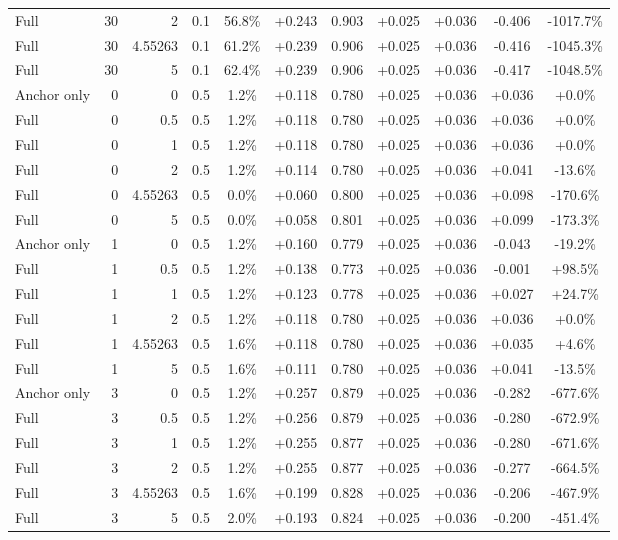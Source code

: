 \begin{table}[htbp]
\begin{tabular}{lrrrccccccc}
Full & 30 & 2 & 0.1 & 56.8\% & +0.243 & 0.903 & +0.025 & +0.036 & -0.406 & -1017.7\% \\
Full & 30 & 4.55263 & 0.1 & 61.2\% & +0.239 & 0.906 & +0.025 & +0.036 & -0.416 & -1045.3\% \\
Full & 30 & 5 & 0.1 & 62.4\% & +0.239 & 0.906 & +0.025 & +0.036 & -0.417 & -1048.5\% \\
Anchor only & 0 & 0 & 0.5 & 1.2\% & +0.118 & 0.780 & +0.025 & +0.036 & +0.036 & +0.0\% \\
Full & 0 & 0.5 & 0.5 & 1.2\% & +0.118 & 0.780 & +0.025 & +0.036 & +0.036 & +0.0\% \\
Full & 0 & 1 & 0.5 & 1.2\% & +0.118 & 0.780 & +0.025 & +0.036 & +0.036 & +0.0\% \\
Full & 0 & 2 & 0.5 & 1.2\% & +0.114 & 0.780 & +0.025 & +0.036 & +0.041 & -13.6\% \\
Full & 0 & 4.55263 & 0.5 & 0.0\% & +0.060 & 0.800 & +0.025 & +0.036 & +0.098 & -170.6\% \\
Full & 0 & 5 & 0.5 & 0.0\% & +0.058 & 0.801 & +0.025 & +0.036 & +0.099 & -173.3\% \\
Anchor only & 1 & 0 & 0.5 & 1.2\% & +0.160 & 0.779 & +0.025 & +0.036 & -0.043 & -19.2\% \\
Full & 1 & 0.5 & 0.5 & 1.2\% & +0.138 & 0.773 & +0.025 & +0.036 & -0.001 & +98.5\% \\
Full & 1 & 1 & 0.5 & 1.2\% & +0.123 & 0.778 & +0.025 & +0.036 & +0.027 & +24.7\% \\
Full & 1 & 2 & 0.5 & 1.2\% & +0.118 & 0.780 & +0.025 & +0.036 & +0.036 & +0.0\% \\
Full & 1 & 4.55263 & 0.5 & 1.6\% & +0.118 & 0.780 & +0.025 & +0.036 & +0.035 & +4.6\% \\
Full & 1 & 5 & 0.5 & 1.6\% & +0.111 & 0.780 & +0.025 & +0.036 & +0.041 & -13.5\% \\
Anchor only & 3 & 0 & 0.5 & 1.2\% & +0.257 & 0.879 & +0.025 & +0.036 & -0.282 & -677.6\% \\
Full & 3 & 0.5 & 0.5 & 1.2\% & +0.256 & 0.879 & +0.025 & +0.036 & -0.280 & -672.9\% \\
Full & 3 & 1 & 0.5 & 1.2\% & +0.255 & 0.877 & +0.025 & +0.036 & -0.280 & -671.6\% \\
Full & 3 & 2 & 0.5 & 1.2\% & +0.255 & 0.877 & +0.025 & +0.036 & -0.277 & -664.5\% \\
Full & 3 & 4.55263 & 0.5 & 1.6\% & +0.199 & 0.828 & +0.025 & +0.036 & -0.206 & -467.9\% \\
Full & 3 & 5 & 0.5 & 2.0\% & +0.193 & 0.824 & +0.025 & +0.036 & -0.200 & -451.4\% \\

\end{tabular}
\end{table}
